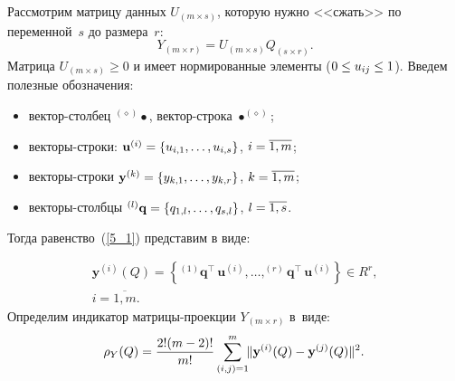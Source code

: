 \begin{multicols}{2}
Рассмотрим матрицу данных $U_{(m \times s)}$, которую нужно <<сжать>> по 
переменной~$s$ до размера~$r$:
\begin{equation}
\label{5_1}
Y_{(m \times r)} = U_{(m \times s)} Q_{(s \times r)}.
\end{equation}
Матрица $U_{(m \times s)} \ge 0$ и имеет нормированные элементы ($0\hm \le 
u_{ij} \hm\le 1$). Введем полезные обозначения:
\begin{itemize}
\item вектор-столбец $^{(\diamond)}\bullet$, век\-тор-стро\-ка 
$\bullet^{(\diamond)}$;
\item векторы-строки: $\mathbf{u}^{(i)} \hm= \{u_{i,1}, \dots, u_{i,s}\}$, $i 
\hm= \overline{1,m}$;
\item векторы-строки  $\mathbf{y}^{(k)} \hm= \{y_{k,1}, \dots, y_{k,r}\}$, 
$k\hm = \overline{1,m}$;
\item векторы-столбцы  $^{(l)}\mathbf{q}\hm = \{q_{1,l}, \dots, q_{s,l}\}$, 
$l\hm = \overline{1,s}$.
\end{itemize}
Тогда равенство~(\ref{5_1}) представим в виде:


\noindent
\begin{multline*}
\mathbf{y}^{(i)}(Q) = \left\{^{(1)}\mathbf{q}^\intercal\,\mathbf{u}^{(i)}, 
\dots, ^{(r)}\mathbf{q}^\intercal\,\mathbf{u}^{(i)}\right\} \in R^r,\\
 i =  \overline{1,m}.
\end{multline*}
Определим индикатор матрицы-проекции $Y_{(m \times r)}$ в~виде:
\begin{equation}
\label{5_3}
\!\!\!\rho_Y(Q) = \displaystyle\frac{\displaystyle 2! (m-2)!\mathstrut}{\displaystyle m!\mathstrut} \sum\limits^m_{(i,j)=1}\!\!\|\mathbf{y}^{(i)}(Q) - 
\mathbf{y}^{(j)}(Q)\|^2.\!\!
\end{equation}


\end{multicols}
